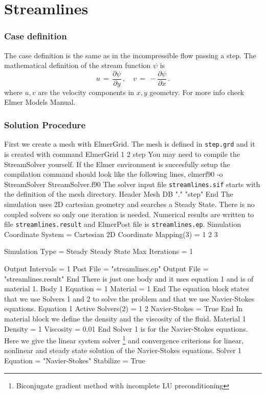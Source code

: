 \chapter{Streamlines}


\subsection*{Case definition}
The case definition is the same as in the incompressible flow passing a step.
The mathematical definition of the stream function $\psi$ is
\begin{equation}
u \, = \, \frac{\partial \psi}{\partial y} \, , \quad
v \, = \, - \frac{\partial \psi}{\partial x} \,.
\end{equation}
where $u,v$ are the velocity components in $x,y$ geometry.
For more info check Elmer Models Manual.

\subsection*{Solution Procedure}
First we create a mesh with ElmerGrid. The mesh is defined in
{\tt step.grd} and it is created with command
\ttbegin
ElmerGrid 1 2 step
\ttend
You may need to compile the StreamSolver yourself. If the Elmer environment is 
succesfully setup the compilation command should look like
the following lines, 
\ttbegin
elmerf90 -o StreamSolver StreamSolver.f90
\ttend
The solver input file {\tt streamlines.sif} starts with 
the definition of the mesh directory. 
\ttbegin
Header
  Mesh DB "." "step"
End
\ttend
The simulation uses 2D cartesian geometry and searches a Steady State.
There is no coupled solvers so only one iteration is needed. 
Numerical results are written to file {\tt streamlines.result}
and ElmerPost file is {\tt streamlines.ep}.
\ttbegin
Simulation
  Coordinate System =  Cartesian 2D
  Coordinate Mapping(3) = 1 2 3

  Simulation Type = Steady
  Steady State Max Iterations = 1

  Output Intervals = 1
  Post File = "streamlines.ep"
  Output File = "streamlines.result"
End
\ttend
There is just one body and it uses equation 1 and
is of material 1.
\ttbegin
Body 1
  Equation = 1
  Material = 1
End
\ttend
The equation block states that we use Solvers 1 and 2 to solve the problem
and that we use Navier-Stokes equations.
\ttbegin
Equation 1
  Active Solvers(2) = 1 2
  Navier-Stokes = True
End
\ttend
In material block we define the density and the viscosity of the fluid.
\ttbegin
Material 1
  Density = 1
  Viscosity = 0.01
End
\ttend
Solver 1 is for the Navier-Stokes equations.
Here we give the linear system solver
\footnote{Biconjugate gradient method with incomplete LU preconditioning}
and convergence criterions for linear, nonlinear and steady state 
solution of the Navier-Stokes equations.
\ttbegin
Solver 1
  Equation = "Navier-Stokes"
  Stabilize = True

